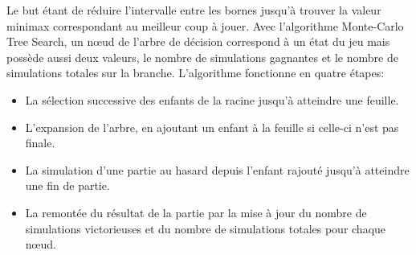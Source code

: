 \documentclass{article}
\begin{document}
\newline
Le but étant de réduire l'intervalle entre les bornes jusqu'à trouver la valeur minimax correspondant au meilleur coup à jouer\cite{MTD(f)}.
\newline\newline
Avec l'algorithme Monte-Carlo Tree Search, un nœud de l'arbre de décision correspond à un état du jeu mais possède aussi deux valeurs, le nombre de simulations gagnantes et le nombre de simulations totales sur la branche.
L'algorithme fonctionne en quatre étapes\cite{MonteCarlo}:
\begin{itemize}
\item La sélection successive des enfants de la racine jusqu'à atteindre une feuille.
\item L'expansion de l'arbre, en ajoutant un enfant à la feuille si celle-ci n'est pas finale.
\item La simulation d'une partie au hasard depuis l'enfant rajouté jusqu'à atteindre une fin de partie.
\item La remontée du résultat de la partie par la mise à jour du nombre de simulations victorieuses et du nombre de simulations totales pour chaque nœud.
\end{itemize}
\end{document}
